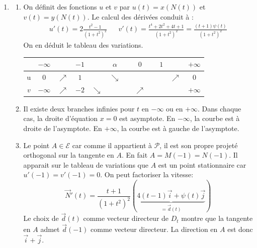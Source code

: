\begin{enumerate}
 \item
\begin{enumerate}
 \item On définit des fonctions $u$ et $v$ par $u(t)=x(N(t))$ et $v(t)=y(N(t))$. Le calcul des dérivées conduit à :
\begin{align*}
 u'(t)=2\frac{t^2-1}{(1+t^2)^2} & &
v'(t)=\frac{t^4+2t^2+4t+1}{(1+t^2)^2}=\frac{(t+1)\psi(t)}{(1+t^2)^2}
\end{align*}
On en déduit le tableau des variations.
\begin{center}
\renewcommand{\arraystretch}{1.2}
\begin{tabular}{|cccccccccccc|} \hline 
 & $-\infty$ &  & $-1$ &  & $\alpha$ &  & $0$ &  & $1$ &  & $+\infty$\\ \hline
u & $0$ & $\nearrow$ & $1$ &  & $\searrow$ &  &  &  &  & $\nearrow$  & $0$\\ \hline
$v$ & $-\infty$ & $\nearrow$ & $-2$ & $\searrow$ &  &  & $\nearrow$ &  &  &  & $+\infty$ \\ \hline
\end{tabular}
\end{center}

 \item Il existe deux branches infinies pour $t$ en $-\infty$ ou en $+\infty$. Dans chaque cas, la droite d'équation $x=0$ est asymptote.\newline
En $-\infty$, la courbe est à droite de l'asymptote. En $+\infty$, la courbe est à gauche de l'asymptote.
 \item Le point $A\in \mathcal{E}$ car comme il appartient à $\mathcal{P}$, il est son propre projeté orthogonal sur la tangente en $A$. En fait $A=M(-1)=N(-1)$.\newline
Il apparait sur le tableau de variations que $A$ est un point stationnaire car $u'(-1)=v'(-1)=0$. On peut factoriser la vitesse:
\begin{displaymath}
 \overrightarrow{N}'(t)=\frac{t+1}{(1+t^2)^2}
\left(
\underset{=\overrightarrow d(t)}{\underbrace{4(t-1)\overrightarrow i +\psi(t)\overrightarrow j}}
 \right) 
\end{displaymath}
Le choix de $\overrightarrow d (t)$ comme vecteur directeur de $D_t$ montre que la tangente en $A$ admet $\overrightarrow d(-1)$ comme vecteur directeur. La direction en $A$ est donc $\overrightarrow i + \overrightarrow j$.

\end{enumerate}


\end{enumerate}
